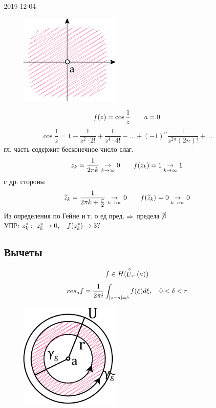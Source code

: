 \documentclass[main]{subfiles}
\begin{document}
\begin{lect}{2019-12-04}
    \begin{Example}[3 сущ. ос-ть]
        \begin{figure}[H]
            \includegraphics[width=5cm]{pics/13_2.png}
            \centering
        \end{figure}
        
        \[f(z) = \cos \frac{1}{z} \qquad a = 0\]
        \[\cos \frac{1}{z} = 1 - \frac{1}{z^2 \cdot 2!} + \frac{1}{z^4 \cdot 4!} - ... +
        (-1)^n \frac{1}{z^{2n}(2n)! } + ...\]
        гл. часть содержит бесконечное число слаг.\\
        \[z_k = \frac{1}{2\pi k} \underset{k \to \infty}{\to } 0 \qquad f(z_k) = 1 \underset{k \to \infty}{\to } 1\]
        с др. стороны
        \[\widetilde{z}_k = \frac{1}{2\pi k + \frac{\pi}{2}} \underset{k \to \infty}{\to } 0\qquad
        f(\widetilde{z}_k) = 0 \underset{k \to \infty}{\to } 0\]
        Из определения по Гейне и т. о ед пред. $\Rightarrow $ предела $\cancel{\exists }$\\
        УПР: $z^*_k : \ z_k^* \to  0, \quad f(z_k^*) \to 3?$
    \end{Example}

    \subsection{Вычеты}

    \begin{Definition}
        \[f \in H(\stackrel{\circ}{U}_r(a))\]
        \[res_a f = \frac{1}{2\pi i}\int_{\left|z - a\right| = \delta} f(\xi)d\xi , \quad 0 < \delta < r \]
        \begin{figure}[H]
            \includegraphics[width=5cm]{pics/13_3.png}
            \centering
        \end{figure}
        

\end{Definition}
\end{lect}
\end{document}
